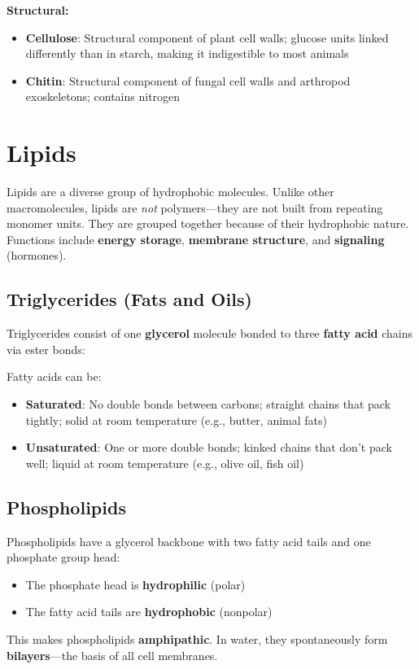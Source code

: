 \documentclass{report}
\begin{document}
\textbf{Structural:}
\begin{itemize}
    \item \textbf{Cellulose}: Structural component of plant cell walls; glucose units linked differently than in starch, making it indigestible to most animals
    \item \textbf{Chitin}: Structural component of fungal cell walls and arthropod exoskeletons; contains nitrogen
\end{itemize}

\section{Lipids}

Lipids are a diverse group of hydrophobic molecules. Unlike other macromolecules, lipids are \emph{not} polymers---they are not built from repeating monomer units. They are grouped together because of their hydrophobic nature. Functions include \textbf{energy storage}, \textbf{membrane structure}, and \textbf{signaling} (hormones).

\subsection{Triglycerides (Fats and Oils)}

Triglycerides consist of one \textbf{glycerol} molecule bonded to three \textbf{fatty acid} chains via ester bonds:
\begin{center}
\end{center}

Fatty acids can be:
\begin{itemize}
    \item \textbf{Saturated}: No double bonds between carbons; straight chains that pack tightly; solid at room temperature (e.g., butter, animal fats)
    \item \textbf{Unsaturated}: One or more double bonds; kinked chains that don't pack well; liquid at room temperature (e.g., olive oil, fish oil)
\end{itemize}

\subsection{Phospholipids}

Phospholipids have a glycerol backbone with two fatty acid tails and one phosphate group head:
\begin{itemize}
    \item The phosphate head is \textbf{hydrophilic} (polar)
    \item The fatty acid tails are \textbf{hydrophobic} (nonpolar)
\end{itemize}
This makes phospholipids \textbf{amphipathic}. In water, they spontaneously form \textbf{bilayers}---the basis of all cell membranes.
\end{document}
